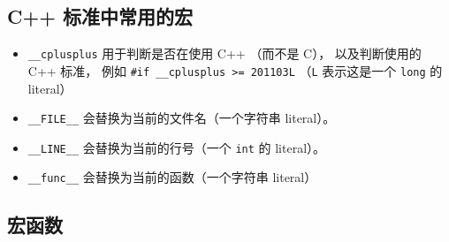 \subsection{C++ 标准中常用的宏}
\begin{itemize}
\item \verb|__cplusplus| 用于判断是否在使用 C++ （而不是 C）， 以及判断使用的 C++ 标准， 例如 \verb|#if __cplusplus >= 201103L| （\verb|L| 表示这是一个 \verb|long| 的 literal）
\item \verb|__FILE__| 会替换为当前的文件名（一个字符串 literal）。
\item \verb|__LINE__| 会替换为当前的行号（一个 \verb|int| 的 literal）。
\item \verb|__func__| 会替换为当前的函数（一个字符串 literal）
\end{itemize}

\subsection{宏函数}
